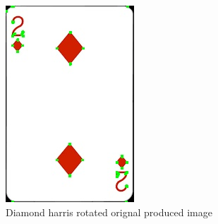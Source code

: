 \documentclass[conference]{IEEEtran}
\begin{document}
\begin{figure}[!htb]
  \centering
  \begin{minipage}[b]{0.2\textwidth}
    \includegraphics[width=\textwidth]{../programme/results/Task_1/rotated_experiements/Harris/diamond/image_0.jpg}
    \caption{Diamond harris rotated orignal produced image}
    \label{Diamond harris rotated orignal produced image}
  \end{minipage}
  \hfill
  \begin{minipage}[b]{0.2\textwidth}

\end{minipage}
\end{figure}
\end{document}
